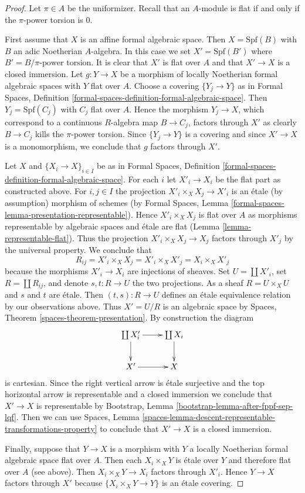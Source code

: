 \documentclass[10pt,a4paper]{amsart}
\theoremstyle{plain}
\theoremstyle{definition}
\theoremstyle{remark}
\numberwithin{equation}{subsection}
\begin{document}
\begin{proof}
Let $\pi \in A$ be the uniformizer. Recall that an $A$-module
is flat if and only if the $\pi$-power torsion is $0$.

\medskip\noindent
First assume that $X$ is an affine formal algebraic space.
Then $X = \text{Spf}(B)$ with $B$ an adic Noetherian $A$-algebra.
In this case we set $X' = \text{Spf}(B')$ where
$B' = B/\pi\text{-power torsion}$. It is clear that $X'$ is flat
over $A$ and that $X' \to X$ is a closed immersion.
Let $g : Y \to X$ be a morphism of locally Noetherian formal algebraic spaces
with $Y$ flat over $A$. Choose a covering $\{Y_j \to Y\}$ as in
Formal Spaces, Definition
\ref{formal-spaces-definition-formal-algebraic-space}.
Then $Y_j = \text{Spf}(C_j)$ with $C_j$ flat over $A$.
Hence the morphism $Y_j \to X$, which correspond to a continuous
$R$-algebra map $B \to C_j$, factors through $X'$ as clearly
$B \to C_j$ kills the $\pi$-power torsion.
Since $\{Y_j \to Y\}$ is a covering and since $X' \to X$
is a monomorphism, we conclude that $g$ factors through $X'$.

\medskip\noindent
Let $X$ and $\{X_i \to X\}_{i \in I}$ be as in
Formal Spaces, Definition
\ref{formal-spaces-definition-formal-algebraic-space}.
For each $i$ let $X'_i \to X_i$ be the flat part as
constructed above. For $i, j \in I$ the projection
$X'_i \times_X X_j \to X'_i$ is an \'etale (by assumption)
morphism of schemes (by Formal Spaces, Lemma
\ref{formal-spaces-lemma-presentation-representable}).
Hence $X'_i \times_X X_j$ is flat over $A$ as morphisms
representable by algebraic spaces and \'etale
are flat (Lemma \ref{lemma-representable-flat}).
Thus the projection $X'_i \times_X X_j \to X_j$ factors
through $X'_j$ by the universal property. We conclude that
$$
R_{ij} = X'_i \times_X X_j = X'_i \times_X X'_j = X_i \times_X X'_j
$$
because the morphisms $X'_i \to X_i$ are injections of sheaves.
Set $U = \coprod X'_i$, set
$R = \coprod R_{ij}$, and denote $s, t : R \to U$ the two
projections. As a sheaf $R = U \times_X U$ and $s$ and $t$
are \'etale. Then $(t, s) : R \to U$ defines an \'etale equivalence
relation by our observations above. Thus $X' = U/R$ is an
algebraic space by Spaces, Theorem \ref{spaces-theorem-presentation}.
By construction the diagram
$$
\xymatrix{
\coprod X'_i \ar[r] \ar[d] & \coprod X_i \ar[d] \\
X' \ar[r] & X
}
$$
is cartesian. Since the right vertical arrow is \'etale surjective
and the top horizontal arrow is representable and a closed immersion
we conclude that $X' \to X$ is representable by
Bootstrap, Lemma \ref{bootstrap-lemma-after-fppf-sep-lqf}.
Then we can use Spaces, Lemma
\ref{spaces-lemma-descent-representable-transformations-property}
to conclude that $X' \to X$ is a closed immersion.

\medskip\noindent
Finally, suppose that $Y \to X$ is a morphism with
$Y$ a locally Noetherian formal algebraic space flat over $A$.
Then each $X_i \times_X Y$ is \'etale over $Y$ and
therefore flat over $A$ (see above).
Then $X_i \times_X Y \to X_i$ factors through $X'_i$.
Hence $Y \to X$ factors through $X'$ because
$\{X_i \times_X Y \to Y\}$ is an \'etale covering.
\end{proof}
\end{document}
